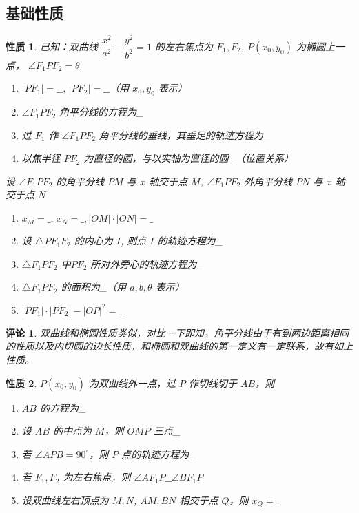 \documentclass[a4paper,10pt,twoside]{article}
\newtheorem{remark}{评论}
\newtheorem{proposition}{性质}
\begin{document}
\subsection{基础性质}
\begin{proposition}
    已知：双曲线 $ \dfrac{x^2}{a^2}-\dfrac{y^2}{b^2}=1 $ 的左右焦点为 $ F_1,F_2 $, $ P(x_0,y_0) $ 为椭圆上一点， $ \angle F_1PF_2=\theta $ 
    \begin{enumerate}[ $ (1) $ ]
        \item  $ |PF_1|=\_\_,\,|PF_2|=\_\_ $（用 $ x_0,y_0  $ 表示） 
        \item  $ \angle F_1PF_2 $ 角平分线的方程为\_
        \item 过 $ F_1 $ 作 $ \angle F_1PF_2 $ 角平分线的垂线，其垂足的轨迹方程为\_
        \item 以焦半径 $ PF_2 $ 为直径的圆，与以实轴为直径的圆\_（位置关系）
    \end{enumerate} 
    设 $ \angle F_1PF_2 $ 的角平分线 $ PM $ 与 $ x  $ 轴交于点 $ M $, $ \angle F_1PF_2 $ 外角平分线 $ PN $ 与 $ x  $ 轴交于点 $ N $
    \begin{enumerate}
        \item[ $ (4) $ ]  $ x_M=\_,\,x_N=\_,|OM|\cdot|ON|=\_ $
        \item[ $ (5) $ ] 设 $ \triangle PF_1F_2 $ 的内心为 $ I  $, 则点 $ I  $ 的轨迹方程为\_
        \item[ $ (6) $ ]  $ \triangle F_1PF_2 $ 中$ PF_2 $ 所对外旁心的轨迹方程为\_
        \item[ $ (7) $ ]  $ \triangle F_1PF_2 $ 的面积为\_（用 $ a,b,\theta $ 表示）
        \item[ $ (8) $ ]  $ |PF_1|\cdot|PF_2|-|OP|^2=\_ $    
    \end{enumerate}   
\end{proposition}
\begin{remark}
    双曲线和椭圆性质类似，对比一下即知。角平分线由于有到两边距离相同的性质以及内切圆的边长性质，和椭圆和双曲线的第一定义有一定联系，故有如上性质。
\end{remark}
\begin{proposition}
    $ P(x_0,y_0) $ 为双曲线外一点，过 $ P  $ 作切线切于 $ AB $，则
    \begin{enumerate}[ $ (1) $ ]
       \item  $ AB  $ 的方程为\_
       \item 设 $ AB  $ 的中点为 $ M  $，则 $ OMP  $ 三点\_
       \item 若 $ \angle APB =90^{\circ} $，则 $ P  $ 点的轨迹方程为\_
       \item 若 $ F_1,F_2  $ 为左右焦点，则 $ \angle AF_1P\_\_\angle BF_1P $   
       \item 设双曲线左右顶点为 $ M,N  $, $ AM,BN  $ 相交于点 $ Q  $，则 $ x_Q =\_ $ 
    \end{enumerate} 
\end{proposition}
\end{document}
